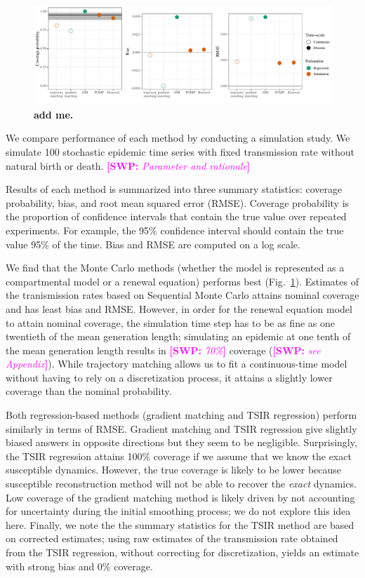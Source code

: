 \documentclass{article}
\newcommand{\fref}[1]{Fig.~\ref{fig:#1}}
\newcommand{\comment}[3]{\textcolor{#1}{\textbf{[#2: }\textsl{#3}\textbf{]}}}
\newcommand{\swp}[1]{\comment{magenta}{SWP}{#1}}
\begin{document}
\begin{figure}[!t]
\includegraphics[width=\textwidth]{../figure/compare_estimate_sir.pdf}
\caption{
\textbf{add me.}
}
\label{fig:coverage}
\end{figure}

We compare performance of each method by conducting a simulation study.
We simulate 100 stochastic epidemic time series with fixed transmission rate without natural birth or death.
\swp{Parameter and rationale} 

Results of each method is summarized into three summary statistics: coverage probability, bias, and root mean squared error (RMSE).
Coverage probability is the proportion of confidence intervals that contain the true value over repeated experiments. For example, the 95\% confidence interval should contain the true value 95\% of the time.
Bias and RMSE are computed on a log scale.

We find that the Monte Carlo methods (whether the model is represented as a compartmental model or a renewal equation) performs best (\fref{coverage}).
Estimates of the tranismission rates based on Sequential Monte Carlo attains nominal coverage and has least bias and RMSE.
However, in order for the renewal equation model to attain nominal coverage, the simulation time step has to be as fine as one twentieth of the mean generation length; simulating an epidemic at one tenth of the mean generation length results in \swp{70\%} coverage (\swp{see Appendix}).
While trajectory matching allows us to fit a continuous-time model without having to rely on a discretization process, it attains a slightly lower coverage than the nominal probability.

Both regression-based methods (gradient matching and TSIR regression) perform similarly in terms of RMSE.
Gradient matching and TSIR regression give slightly biased answers in opposite directions but they seem to be negligible.
Surprisingly, the TSIR regression attains 100\% coverage if we assume that we know the exact susceptible dynamics.
However, the true coverage is likely to be lower because susceptible reconstruction method will not be able to recover the \textit{exact} dynamics.
Low coverage of the gradient matching method is likely driven by not accounting for uncertainty during the initial smoothing process; we do not explore this idea here.
Finally, we note the the summary statistics for the TSIR method are based on corrected estimates; using raw estimates of the transmission rate obtained from the TSIR regression, without correcting for discretization, yields an estimate with strong bias and 0\% coverage.
\end{document}
